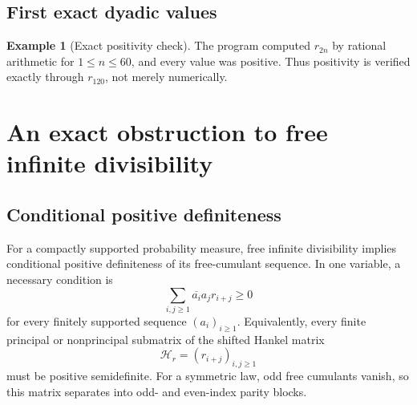 \documentclass[11pt,oneside]{article}
\theoremstyle{definition}
\newtheorem{example}[theorem]{Example}
\theoremstyle{remark}
\begin{document}
\subsection{First exact dyadic values}
\begin{table}[ht]
\centering
\caption{First even moments, free cumulants, and Boolean cumulants of the dyadic up-law.}
\label{tab:firstcumulants}
\end{table}

\begin{example}[Exact positivity check]\label{exp:freepositive}
The program computed \(r_{2n}\) by rational arithmetic for \(1\le n\le60\), and every value was positive. Thus positivity is verified exactly through \(r_{120}\), not merely numerically.
\end{example}

\section{An exact obstruction to free infinite divisibility}
\subsection{Conditional positive definiteness}
For a compactly supported probability measure, free infinite divisibility implies conditional positive definiteness of its free-cumulant sequence. In one variable, a necessary condition is
\begin{equation}\label{eq:CPD}
\sum_{i,j\ge1}\overline{a_i}a_jr_{i+j}\ge0
\end{equation}
for every finitely supported sequence \((a_i)_{i\ge1}\). Equivalently, every finite principal or nonprincipal submatrix of the shifted Hankel matrix
\[
\mathcal H_r=(r_{i+j})_{i,j\ge1}
\]
must be positive semidefinite. For a symmetric law, odd free cumulants vanish, so this matrix separates into odd- and even-index parity blocks.
\end{document}

